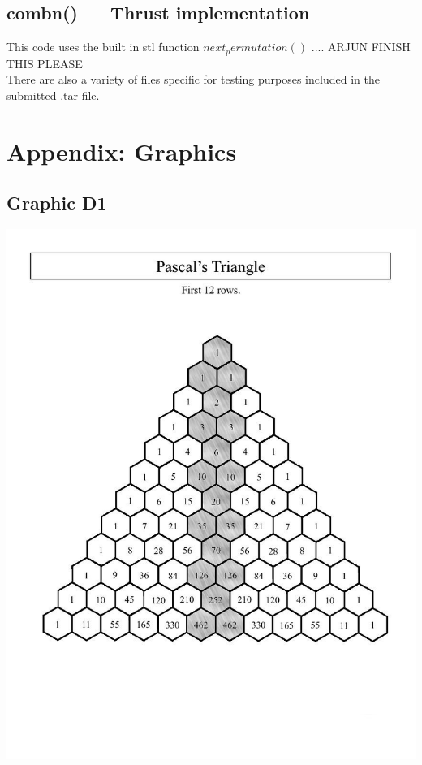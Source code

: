 \documentclass[titlepage, 11pt]{article}
\begin{document}
\subsection{combn() --- Thrust implementation}

This code uses the built in stl function $next_permutation()$ .... ARJUN FINISH THIS PLEASE \\


There are also a variety of files specific for testing purposes included in the submitted .tar file.

\section{Appendix: Graphics}
\subsection{Graphic D1}
\begin{center}
\includegraphics[scale = 0.4]{pascals-triangle-vert.jpg} \\
\end{center}
\end{document}
